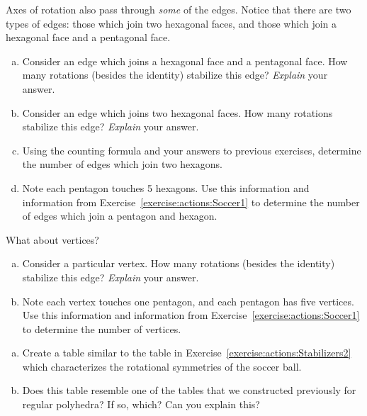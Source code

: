 Axes of rotation also pass through \emph{some} of the edges. Notice that there are two types of edges: those which join two hexagonal faces, and those which join a hexagonal face and a pentagonal face.

\begin{exercise}\label{exercise:actions:Soccer3}
\begin{enumerate}[(a)]
\item
Consider an edge which joins a hexagonal face and a pentagonal face. How many rotations (besides the identity) stabilize this edge?  \emph{Explain} your answer.
\item
Consider an edge which joins two hexagonal faces. How many rotations stabilize this edge?  \emph{Explain} your answer.
\item
Using the counting formula and your answers to previous exercises, determine the number of edges which join  two hexagons.
\item
Note each pentagon touches 5 hexagons. Use this information and information from Exercise~\ref{exercise:actions:Soccer1} to determine the number of edges which join a pentagon and hexagon.
\end{enumerate}
\end{exercise}

What about vertices?

\begin{exercise}\label{exercise:actions:Soccer4}
\begin{enumerate}[(a)]
\item
Consider a particular vertex. How many rotations (besides the identity) stabilize this edge?  \emph{Explain} your answer.
\item
Note each vertex touches one pentagon, and each pentagon has five vertices. Use this information and information from Exercise~\ref{exercise:actions:Soccer1} to determine the number of vertices.
\end{enumerate}
\end{exercise}

\begin{exercise}\label{exercise:actions:Soccer5}
\begin{enumerate}[(a)]
\item
Create a table similar to the table in Exercise~\ref{exercise:actions:Stabilizers2} which characterizes the rotational symmetries of the soccer ball.
\item
Does this table resemble one of the tables that we constructed previously for regular polyhedra? If so, which? Can you explain this?
\end{enumerate}
\end{exercise}


